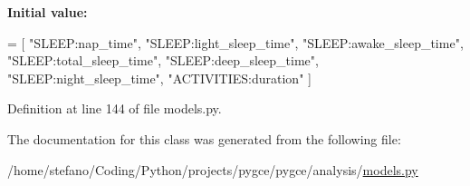 {\bfseries Initial value\+:}
\begin{DoxyCode}
=  [
        \textcolor{stringliteral}{"SLEEP:nap\_time"},
        \textcolor{stringliteral}{"SLEEP:light\_sleep\_time"},
        \textcolor{stringliteral}{"SLEEP:awake\_sleep\_time"},
        \textcolor{stringliteral}{"SLEEP:total\_sleep\_time"},
        \textcolor{stringliteral}{"SLEEP:deep\_sleep\_time"},
        \textcolor{stringliteral}{"SLEEP:night\_sleep\_time"},
        \textcolor{stringliteral}{"ACTIVITIES:duration"}
    ]
\end{DoxyCode}


Definition at line 144 of file models.\+py.



The documentation for this class was generated from the following file\+:\begin{DoxyCompactItemize}
\item 
/home/stefano/\+Coding/\+Python/projects/pygce/pygce/analysis/\hyperlink{models_8py}{models.\+py}\end{DoxyCompactItemize}
